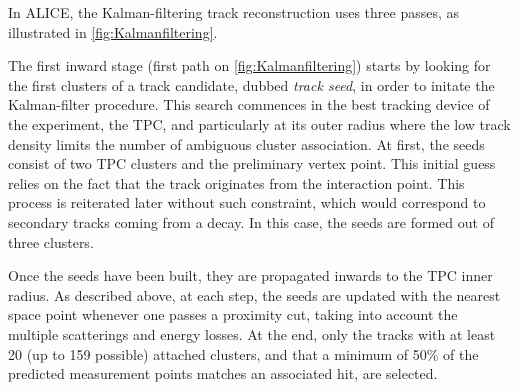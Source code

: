 In ALICE, the Kalman-filtering track reconstruction uses three passes, as illustrated in \fig\ref{fig:Kalmanfiltering}. 

The first inward stage (first path on \fig\ref{fig:Kalmanfiltering}) starts by looking for the first clusters of a track candidate, dubbed \textit{track seed}, in order to initate the Kalman-filter procedure. This search commences in the best tracking device of the experiment, \ie the TPC, and particularly at its outer radius where the low track density limits the number of ambiguous cluster association. At first, the seeds consist of two TPC clusters and the preliminary vertex point. This initial guess relies on the fact that the track originates from the interaction point. This process is reiterated later without such constraint, which would correspond to secondary tracks coming from a decay. In this case, the seeds are formed out of three clusters.

Once the seeds have been built, they are propagated inwards to the TPC inner radius.
As described above, at each step, the seeds are updated with the nearest space point whenever one passes a proximity cut, taking into account the multiple scatterings and energy losses. At the end, only the tracks with at least 20 (up to 159 possible) attached clusters, and that a minimum of 50\% of the predicted measurement points matches an associated hit, are selected. 


